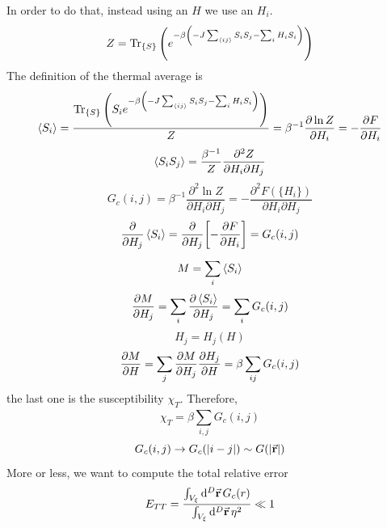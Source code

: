 \documentclass[../main/main.tex]{subfiles}
\begin{document}
In order to do that, instead using an \( H \) we use an \( H_i \).
\begin{equation}
  Z = \Tr_{\{ S \} } \qty(e^{-\beta \qty(-J \sum_{\expval{ij} }^{} S_i S_j   - \sum_{i}^{} H_i S_i ) } )
\end{equation}
The definition of the thermal average is
\begin{equation}
  \expval{S_i} = \frac{\Tr_{\{ S \} } \qty(S_i e^{-\beta \qty(-J \sum_{\expval{ij} }^{} S_i S_j   - \sum_{i}^{} H_i S_i ) } ) }{Z}
  = \beta ^{-1} \pdv{\ln{Z} }{H_i} = - \pdv{F}{H_i}
\end{equation}
\begin{equation}
  \expval{S_i S_j} = \frac{\beta ^{-1}}{Z} \frac{\partial^2{Z} }{\partial{H_i} \partial{H_j}  }
\end{equation}
\begin{equation}
  G_c (i,j) = \beta ^{-1} \frac{\partial^2{\ln{Z} } }{\partial{H_i} \partial{H_j}  }
  = - \frac{\partial^2{F(\{ H_i \}  )} }{\partial{H_i} \partial{H_j}  }
\end{equation}
\begin{equation}
  \pdv{}{H_j} \expval{S_i} = \pdv{}{H_j} \qty[-\pdv{F}{H_i} ] = G_c (i,j)
\end{equation}
\begin{equation}
  M = \sum_{i}^{} \expval{S_i}
\end{equation}
\begin{equation}
  \pdv{M}{H_j} = \sum_{i}^{} \pdv{\expval{S_i} }{H_j} = \sum_{i}^{} G_c (i,j)
\end{equation}
\begin{equation}
  H_j = H_j (H)
\end{equation}
\begin{equation}
  \pdv{M}{H} = \sum_{j}^{} \pdv{M}{H_j} \pdv{H_j}{H}
  =  \beta \sum_{ij}^{} G_c (i,j)
\end{equation}
the last one is the susceptibility \( \chi _T \).
 Therefore,
 \begin{equation}
   \chi _T = \beta \sum_{i,j}^{} G_c (i,j)
 \end{equation}
 \begin{equation}
   G_c (i,j) \rightarrow G_c (\abs{i-j} ) \sim G (\abs{\va{r}} )
 \end{equation}
More or less, we want to compute the total relative error
\begin{equation}
  E_{TT} = \frac{\int_{V_ \xi }^{ } \dd[D]{\va{r}}  G_c (r)}{ \int_{V_ \xi }^{} \dd[D]{\va{r}} \eta ^2 } \ll 1
\end{equation}
\end{document}
